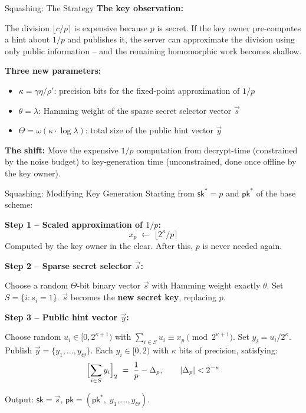 \documentclass[10pt]{beamer}
\begin{document}
\begin{frame}{Squashing: The Strategy}
    \textbf{The key observation:}

    The division $\lfloor c/p \rceil$ is expensive because $p$ is secret.
    If the key owner pre-computes a hint about $1/p$ and publishes it,
    the server can approximate the division using only public information  -- 
    and the remaining homomorphic work becomes shallow.
    \pause

    \vspace{0.3cm}
    \textbf{Three new parameters:}
    \begin{itemize}
        \item $\kappa = \gamma\eta/\rho'$:\quad
              precision bits for the fixed-point approximation of $1/p$
        \item $\theta = \lambda$:\quad
              Hamming weight of the sparse secret selector vector $\vec{s}$
        \item $\Theta = \omega(\kappa \cdot \log\lambda)$:\quad
              total size of the public hint vector $\vec{y}$
    \end{itemize}
    \pause

    \vspace{0.3cm}
    \textbf{The shift:} Move the expensive $1/p$ computation from
    decrypt-time (constrained by the noise budget) to key-generation time
    (unconstrained, done once offline by the key owner).
\end{frame}

\begin{frame}{Squashing: Modifying Key Generation}
    Starting from $\mathsf{sk}^* = p$ and $\mathsf{pk}^*$ of the base scheme:

    \vspace{0.15cm}
    \textbf{Step 1  --  Scaled approximation of $1/p$:}
    \[
        x_p \;\leftarrow\; \lfloor 2^\kappa / p \rceil
    \]
    Computed by the key owner in the clear. After this, $p$ is never needed again.
    \pause

    \vspace{0.15cm}
    \textbf{Step 2  --  Sparse secret selector $\vec{s}$:}

    Choose a random $\Theta$-bit binary vector $\vec{s}$ with Hamming weight
    exactly $\theta$. Set $S = \{i : s_i = 1\}$.
    $\vec{s}$ becomes the \textbf{new secret key}, replacing $p$.
    \pause

    \vspace{0.15cm}
    \textbf{Step 3  --  Public hint vector $\vec{y}$:}

    Choose random $u_i \in [0, 2^{\kappa+1})$ with
    $\sum_{i \in S} u_i \equiv x_p \pmod{2^{\kappa+1}}$.
    Set $y_i = u_i / 2^\kappa$. Publish $\vec{y} = \{y_1, \ldots, y_\Theta\}$.
    Each $y_i \in [0,2)$ with $\kappa$ bits of precision, satisfying:
    \[
        \Bigl[\sum_{i \in S} y_i\Bigr]_2 \;=\; \frac{1}{p} - \Delta_p,
        \qquad |\Delta_p| < 2^{-\kappa}
    \]

    Output: $\mathsf{sk} = \vec{s}$,\quad
    $\mathsf{pk} = (\mathsf{pk}^*,\; y_1, \ldots, y_\Theta)$.
\end{frame}
\end{document}
